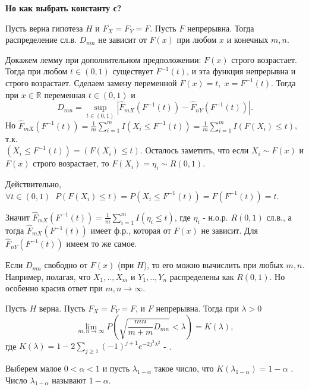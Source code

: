 \begin{example}
	\textbf{Но как выбрать константу с?}
	\begin{lemma}
		Пусть верна гипотеза $H$ и $F_X = F_Y = F$. Пусть $F$ непрерывна. Тогда распределение сл.в. $D_{mn}$ не зависит от $F(x)$ при любом $x$ и конечных $m,n$.
	\end{lemma}
	\begin{Proof}
		Докажем лемму при дополнительном предположении: $F(x)$ строго возрастает. Тогда при любом $t \in (0,1)$ существует $F^{-1}(t)$, и эта функция непрерывна и строго возрастает. Сделаем замену переменной $F(x) = t, \; x =F^{-1}(t)$. Тогда при $x \in \mathbb{R}$ переменная $t \in (0,1)$ и 
		\[D_{mn} = \sup\limits_{t \in (0,1)}|\hat{F}_{mX}(F^{-1}(t)) -\hat{F}_{nY}(F^{-1}(t))|.\]
		Но $\displaystyle \hat{F}_{mX}(F^{-1}(t)) = \frac{1}{m}\sum\limits_{i=1}^{m}I(X_i \leq F^{-1}(t)) = \frac{1}{m}\sum\limits_{i=1}^{m}I(F(X_i)\leq t)$, т.к.\\ $ (X_i \leq F^{-1}(t)) = (F(X_i)\leq t)$. Осталось заметить, что если $X_i \sim F(x)$ и $F(x)$ строго возрастает, то $\displaystyle F(X_i)	=\eta_i \sim R(0,1)$.

		\noindent Действительно, 
		$\displaystyle \forall t \in (0,1) \;\; P(F(X_i) \leq t) = P(X_i \leq F^{-1}(t)) = F(F^{-1}(t)) = t$.

		\noindent Значит $\displaystyle \hat{F}_{mX}(F^{-1}(t)) = \frac{1}{m}\sum\limits_{i=1}^{m}I(\eta_i \leq t)$,
		где $ {\eta_i}$ - н.о.р. $ R(0,1)$ сл.в., а тогда $\hat{F}_{mX}(F^{-1}(t))$ имеет ф.р., которая от $F(x)$ не зависит. Для $\hat{F}_{nY}(F^{-1}(t))$ имеем то же самое. 
	\end{Proof}

	\vspace{0.3cm}
	Если $D_{mn}$ свободно от $F(x)$ (при $H$), то его можно вычислить при любых $m,n$. Например, полагая, что $X_1, .., X_m$ и $Y_1, .., Y_n$ распределены как $R(0,1)$. Но особенно красив ответ при $m,n \rightarrow  \infty$.

	\begin{theorem}
		Пусть $H$ верна. Пусть $F_X = F_Y =F$, и $F$ непрерывна. Тогда при $\lambda > 0$
		\[ \lim\limits_{m,n \rightarrow \infty}P(\sqrt{\frac{mn}{m+m}D_{mn}}< \lambda) = K(\lambda),\]
		где $ K(\lambda) = 1 - 2 \sum\limits_{j\geq1}(-1)^{j+1}e^{-2j^2\lambda^2} $ - .
	\end{theorem}
	
	Выберем малое $0<\alpha<1$ и пусть $\lambda_{1-\alpha}$ такое число, что $K(\lambda_{1-\alpha}) = 1- \alpha$ . Число $\lambda_{1-\alpha}$ называют  $1-\alpha$.


\end{example}
